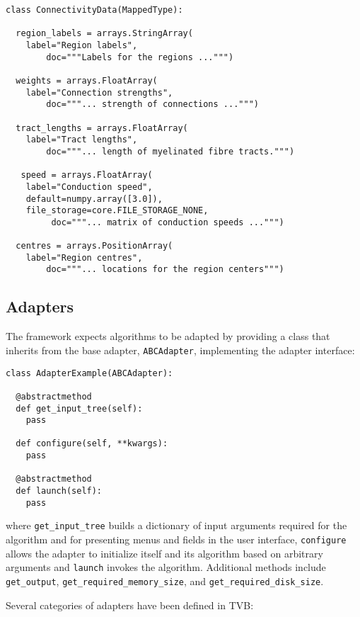 \begin{lstlisting}[caption={The ConnectivityData listing},
                   label={lst:ConnectivityData}]
class ConnectivityData(MappedType):

  region_labels = arrays.StringArray( 
	label="Region labels", 
        doc="""Labels for the regions ...""")

  weights = arrays.FloatArray( 
	label="Connection strengths",
        doc="""... strength of connections ...""")

  tract_lengths = arrays.FloatArray( 
	label="Tract lengths",
        doc="""... length of myelinated fibre tracts.""")

   speed = arrays.FloatArray( 
	label="Conduction speed", 
	default=numpy.array([3.0]), 
	file_storage=core.FILE_STORAGE_NONE,
         doc="""... matrix of conduction speeds ...""")

  centres = arrays.PositionArray( 
	label="Region centres",
        doc="""... locations for the region centers""")
\end{lstlisting}
	

\subsection{Adapters}

The framework expects algorithms to be adapted by providing a class
that inherits from the base adapter, \texttt{ABCAdapter}, implementing 
the adapter interface:

\begin{lstlisting}[caption={Excerpt of the ABCAdapter},
                   label={lst:ABCAdapter}]
class AdapterExample(ABCAdapter):

  @abstractmethod
  def get_input_tree(self):
  	pass

  def configure(self, **kwargs):
  	pass

  @abstractmethod
  def launch(self):
  	pass
\end{lstlisting}

\noindent where \texttt{get\_input\_tree} builds a dictionary of input
arguments required for the algorithm and for
presenting menus and fields in the user interface, \texttt{configure} allows the 
adapter to initialize itself and its algorithm based on arbitrary arguments
and \texttt{launch} invokes the algorithm.
Additional methods include \texttt{get\_output}, \texttt{get\_required\_memory\_size},
and
\texttt{get\_required\_disk\_size}.

Several categories of adapters have been defined in TVB: 

